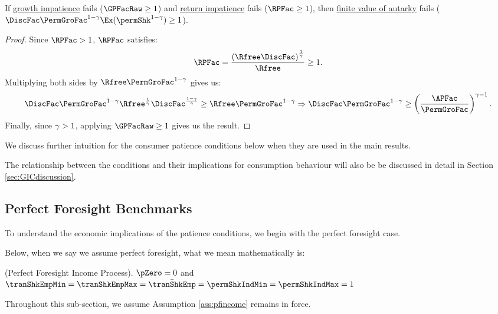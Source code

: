 \documentclass[BufferStockTheory]{subfiles}
\begin{document}
\begin{claim}\label{claim:noRICGIC}
If \hyperlink{GIC}{growth impatience} fails ($\GPFacRaw  \geq 1$) and \hyperlink{RIC}{return impatience} fails ($\RPFac \geq 1$), then \hyperlink{FVAC}{finite value of autarky} fails ($\DiscFac \PermGroFac^{1-\CRRA}\Ex(\permShk^{1-\CRRA})\geq 1$). 
\end{claim}

\begin{proof}
Since $\RPFac  > 1$, $\RPFac $ satisfies:
%
%
\begin{equation}
\RPFac = \frac{\left(\Rfree\DiscFac\right)^{\frac{1}{\CRRA}}}{\Rfree}\geq 1.
\end{equation}
%
Multiplying both sides by $\Rfree\PermGroFac^{1-\CRRA}$ gives us:
%
\begin{equation}
\DiscFac\PermGroFac^{1-\CRRA}\Rfree^{\frac{1}{\CRRA}}\DiscFac^{\frac{1-\CRRA}{\CRRA}}{}\geq\Rfree \PermGroFac^{1-\CRRA} \Rightarrow \DiscFac\PermGroFac^{1-\CRRA}\geq\left(\frac{\APFac}{\PermGroFac}\right)^{\CRRA-1}.
\end{equation}
%
Finally, since $\gamma>1$, applying $\GPFacRaw  \geq 1$ gives us the result.

\end{proof}

We discuss further intuition for the consumer patience conditions below when they are used in the main results.

The relationship between the conditions and their implications for consumption behaviour will also be be discussed in detail in Section \ref{sec:GICdiscussion}.

\hypertarget{Perfect-Foresight-Benchmarks}{}
\subsection{Perfect Foresight Benchmarks}\label{subsec:PFBbenchmark}
To understand the economic implications of the patience conditions, we begin with the perfect foresight case.

Below, when we say we assume perfect foresight, what we mean mathematically is:
%
\begin{assumI}\label{ass:pfincome}(Perfect Foresight Income Process).
$\pZero=0$ and $\tranShkEmpMin=\tranShkEmpMax=\bar{\tranShkEmp}=\permShkIndMin=\permShkIndMax=1$
\end{assumI}

Throughout this sub-section, we assume Assumption \ref{ass:pfincome} remains in force.
\end{document}
